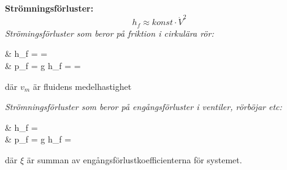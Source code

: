 	\textbf{Strömningsförluster: } 
	\begin{equation*}
		h_f \approx konst \cdot \dot{V}^2
	\end{equation*}
	\textit{Strömingsförluster som beror på friktion i cirkulära rör:}
	\begin{flalign*}
	&	h_f =  =   \\
	&	p_f = \rho \cdot g \cdot h_f = \rho \cdot {} =  \rho \cdot {}
	\end{flalign*}
		där $v_m$ är fluidens medelhastighet \par 
	\textit{Strömningsförluster som beror på engångsförluster i ventiler, rörböjar etc:} 
	\begin{flalign*}
	&	h_f = \dfrac{\xi \cdot v^2_m}{2 \cdot g}\\	
	&	p_f = \rho \cdot g \cdot h_f = \rho \cdot \dfrac{\xi \cdot v^2_m}{2}	
	\end{flalign*}
 där $\xi$ är summan av engångsförlustkoefficienterna för systemet. 
